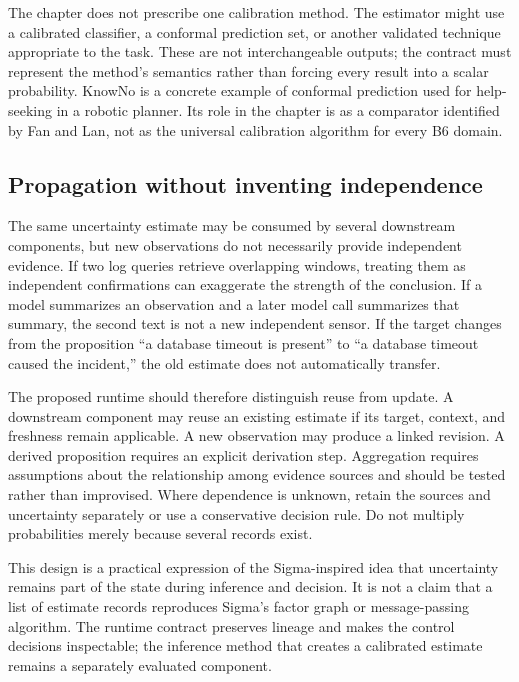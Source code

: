 The chapter does not prescribe one calibration method. The estimator might use a calibrated classifier, a conformal prediction set, or another validated technique appropriate to the task. These are not interchangeable outputs; the contract must represent the method's semantics rather than forcing every result into a scalar probability. KnowNo is a concrete example of conformal prediction used for help-seeking in a robotic planner. Its role in the chapter is as a comparator identified by Fan and Lan, not as the universal calibration algorithm for every B6 domain.\autocite{ren2023knowno}

\subsection{Propagation without inventing independence}
\label{sec:ch16-uncertainty-propagation}

The same uncertainty estimate may be consumed by several downstream components, but new observations do not necessarily provide independent evidence. If two log queries retrieve overlapping windows, treating them as independent confirmations can exaggerate the strength of the conclusion. If a model summarizes an observation and a later model call summarizes that summary, the second text is not a new independent sensor. If the target changes from the proposition ``a database timeout is present'' to ``a database timeout caused the incident,'' the old estimate does not automatically transfer.

The proposed runtime should therefore distinguish reuse from update. A downstream component may reuse an existing estimate if its target, context, and freshness remain applicable. A new observation may produce a linked revision. A derived proposition requires an explicit derivation step. Aggregation requires assumptions about the relationship among evidence sources and should be tested rather than improvised. Where dependence is unknown, retain the sources and uncertainty separately or use a conservative decision rule. Do not multiply probabilities merely because several records exist.

This design is a practical expression of the Sigma-inspired idea that uncertainty remains part of the state during inference and decision. It is not a claim that a list of estimate records reproduces Sigma's factor graph or message-passing algorithm. The runtime contract preserves lineage and makes the control decisions inspectable; the inference method that creates a calibrated estimate remains a separately evaluated component.

